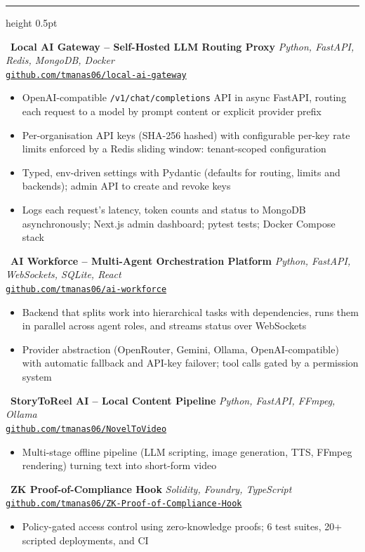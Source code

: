 \documentclass[11pt,a4paper]{article}
\newcommand{\cvsection}[1]{%
  \vspace{6pt}%
  \noindent{\large\textbf{\MakeUppercase{#1}}}%
  \vspace{2pt}%
  \hrule height 0.5pt%
  \vspace{4pt}%
}
\newcommand{\projectentry}[4]{%
  \noindent
  \faGithub\ \textbf{#1} \hfill \textit{#2} \\
  {\small\texttt{#3}}
  \begin{itemize}[leftmargin=1.5em, itemsep=0.5pt, parsep=0pt, topsep=1pt]
    #4
  \end{itemize}
  \vspace{2pt}
}
\begin{document}
\cvsection{Projects}

\projectentry{Local AI Gateway -- Self-Hosted LLM Routing Proxy}%
  {Python, FastAPI, Redis, MongoDB, Docker}%
  {\href{https://github.com/tmanas06/local-ai-gateway}{github.com/tmanas06/local-ai-gateway}}%
  {\item OpenAI-compatible \texttt{/v1/chat/completions} API in async FastAPI, routing each request to a model by prompt content or explicit provider prefix
   \item Per-organisation API keys (SHA-256 hashed) with configurable per-key rate limits enforced by a Redis sliding window: tenant-scoped configuration
   \item Typed, env-driven settings with Pydantic (defaults for routing, limits and backends); admin API to create and revoke keys
   \item Logs each request's latency, token counts and status to MongoDB asynchronously; Next.js admin dashboard; pytest tests; Docker Compose stack}

\projectentry{AI Workforce -- Multi-Agent Orchestration Platform}%
  {Python, FastAPI, WebSockets, SQLite, React}%
  {\href{https://github.com/tmanas06/ai-workforce}{github.com/tmanas06/ai-workforce}}%
  {\item Backend that splits work into hierarchical tasks with dependencies, runs them in parallel across agent roles, and streams status over WebSockets
   \item Provider abstraction (OpenRouter, Gemini, Ollama, OpenAI-compatible) with automatic fallback and API-key failover; tool calls gated by a permission system}

\projectentry{StoryToReel AI -- Local Content Pipeline}%
  {Python, FastAPI, FFmpeg, Ollama}%
  {\href{https://github.com/tmanas06/NovelToVideo}{github.com/tmanas06/NovelToVideo}}%
  {\item Multi-stage offline pipeline (LLM scripting, image generation, TTS, FFmpeg rendering) turning text into short-form video}

\projectentry{ZK Proof-of-Compliance Hook}%
  {Solidity, Foundry, TypeScript}%
  {\href{https://github.com/tmanas06/ZK-Proof-of-Compliance-Hook}{github.com/tmanas06/ZK-Proof-of-Compliance-Hook}}%
  {\item Policy-gated access control using zero-knowledge proofs; 6 test suites, 20+ scripted deployments, and CI}
\end{document}
